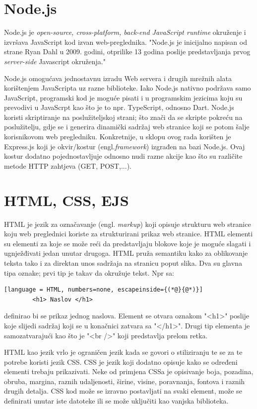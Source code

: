 \documentclass[times, utf8, zavrsni, numeric]{fer}
\begin{document}
	
	\section{Node.js}
	Node.js je \textit{open-source, cross-platform, back-end JavaScript runtime} okruženje i izvršava JavaScript kod izvan web-preglednika. "Node.js je inicijalno napisan od strane  Ryan Dahl u 2009. godini, otprilike 13 godina poslije predstavljanja
	prvog  \textit{server-side} Javascript okruženja."\cite{node}
	
	Node.js omogućava jednostavnu izradu Web servera i drugih mrežnih alata korištenjem JavaScripta uz razne biblioteke. Iako Node.js nativno podržava samo JavaScript, programski kod je moguće pisati i u programskim jezicima koju su prevodivi u JavaScrpt kao 
	što je to npr. TypeScript, odnosno Dart. Node.js koristi skriptiranje na poslužiteljskoj strani; što znači da se skripte pokreću na poslužitelju, gdje se i generira dinamički sadržaj web stranice koji se potom šalje korisnikovom web pregledniku. 
	Konkretnije, u sklopu ovog rada korišten je Express.js koji je okvir/kostur (engl.\textit{framework}) izgrađen na bazi Node.js. Ovaj kostur dodatno pojednostavljuje odnosno nudi razne akcije kao što su različite metode HTTP zahtjeva (GET, POST,...).\cite{ejs}
	
	
	\section{HTML, CSS, EJS}
	HTML je jezik za označavanje (engl. \textit{markup}) koji opisuje strukturu web stranice koju web preglednici koriste za strukturirani prikaz web stranice. HTML elementi su elementi za koje se može reći da predstavljaju blokove koje je moguće slagati
	i ugnježđivati jedan unutar drugoga. HTML pruža semantiku kako za oblikovanje teksta tako i za direktan unos sadržaja na stranicu poput slika.
	Dva su glavna tipa oznake; prvi tip je takav da okružuje tekst. Npr sa: 
		\begin{lstlisting}[language = HTML, numbers=none, escapeinside={(*@}{@*)}]
		<h1> Naslov </h1>
		\end{lstlisting}
		definirao bi se prikaz jednog naslova. Element se otvara oznakom "<h1>" poslije koje slijedi sadržaj koji se u konačnici zatvara sa "</h1>". Drugi tip elementa je samozatvarajući kao što je "<br />" koji predstavlja prelom retka.

	HTML kao jezik vrlo je ograničen jezik kada se govori o stiliziranju te se za te potrebe koristi jezik CSS. CSS je jezik koji dodatno opisuje kako se određeni elementi trebaju prikazivati. Neke od primjena CSSa je opisivanje boja, pozadina, obruba,
	margina, raznih udaljenosti, širine, visine, poravnanja, fontova i raznih drugih detalja. CSS kod može se izravno postavljati na svaki element, može se definirati unutar iste datoteke ili se može uključiti kao vanjska biblioteka. 
	
\end{document}
